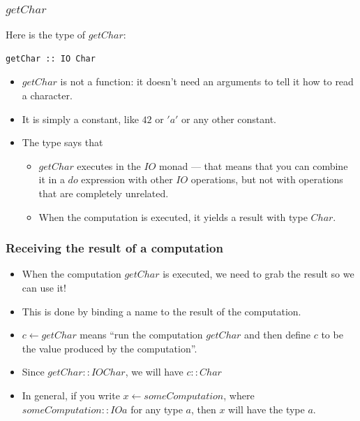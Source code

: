 \documentclass{beamer}
\begin{document}
\begin{frame}[fragile]
\frametitle{$getChar$}

Here is the type of $getChar$:

\begin{verbatim}
getChar :: IO Char
\end{verbatim}

\begin{itemize}
\item $getChar$ is not a function: it doesn't need an arguments to
  tell it how to read a character.
\item It is simply a constant, like $42$ or $'a'$ or any other
  constant.
\item The type says that
  \begin{itemize}
  \item $getChar$ executes in the $IO$ monad --- that means that
    you can combine it in a $do$ expression with other $IO$
    operations, but not with operations that are completely
    unrelated.
  \item When the computation is executed, it yields a result with
    type $Char$.
  \end{itemize}
\end{itemize}
\end{frame}

\begin{frame}[fragile]
\frametitle{Receiving the result of a computation}

\begin{itemize}
\item When the computation $getChar$ is executed, we need to grab
  the result so we can use it!
\item This is done by binding a name to the result of the computation.
\item $c \leftarrow getChar$ means ``run the computation $getChar$ and then
  define $c$ to be the value produced by the computation''.
\item Since $getChar :: IO Char$, we will have $c :: Char$
\item In general, if you write $x  \leftarrow someComputation$, where
  $someComputation :: IO a$ for any type $a$, then $x$ will have
  the type $a$.
\end{itemize}

\end{frame}
\end{document}
